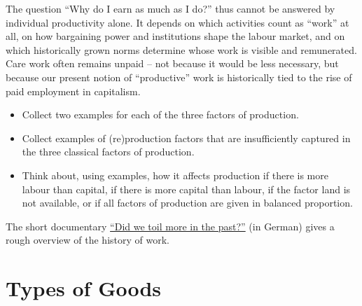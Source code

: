 \documentclass[
  british,
  a4paper,
  DIV=11,
  numbers=noendperiod,
  oneside,
  openany]{scrreprt}
\providecommand{\tightlist}{%
  \setlength{\itemsep}{0pt}\setlength{\parskip}{0pt}}
\begin{document}
The question ``Why do I earn as much as I do?'' thus cannot be answered
by individual productivity alone. It depends on which activities count
as ``work'' at all, on how bargaining power and institutions shape the
labour market, and on which historically grown norms determine whose
work is visible and remunerated. Care work often remains unpaid -- not
because it would be less necessary, but because our present notion of
``productive'' work is historically tied to the rise of paid employment
in capitalism.

\begin{tcolorbox}[enhanced jigsaw, arc=.35mm, bottomrule=.15mm, bottomtitle=1mm, breakable, colback=white, colbacktitle=quarto-callout-caution-color!10!white, colframe=quarto-callout-caution-color-frame, coltitle=black, left=2mm, leftrule=.75mm, opacityback=0, opacitybacktitle=0.6, rightrule=.15mm, title={In-depth questions}, titlerule=0mm, toprule=.15mm, toptitle=1mm]

\begin{itemize}
\tightlist
\item
  Collect two examples for each of the three factors of production.
\item
  Collect examples of (re)production factors that are insufficiently
  captured in the three classical factors of production.
\item
  Think about, using examples, how it affects production if there is
  more labour than capital, if there is more capital than labour, if the
  factor land is not available, or if all factors of production are
  given in balanced proportion.
\end{itemize}

\end{tcolorbox}

\begin{tcolorbox}[enhanced jigsaw, arc=.35mm, bottomrule=.15mm, bottomtitle=1mm, breakable, colback=white, colbacktitle=quarto-callout-note-color!10!white, colframe=quarto-callout-note-color-frame, coltitle=black, left=2mm, leftrule=.75mm, opacityback=0, opacitybacktitle=0.6, rightrule=.15mm, title={Further material}, titlerule=0mm, toprule=.15mm, toptitle=1mm]

The short documentary
\href{https://www.youtube.com/watch?v=krP2vuV90FU}{``Did we toil more in
the past?''} (in German) gives a rough overview of the history of work.

\end{tcolorbox}

\section{Types of Goods}\label{types-of-goods}
\end{document}
